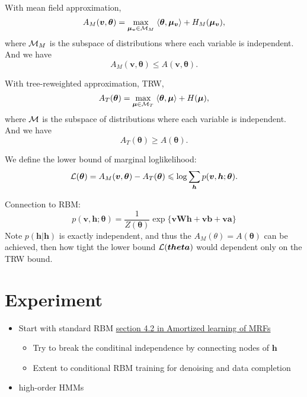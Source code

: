 With mean field approximation,
\begin{equation}
  A_{M}(\bm{v}, \bm{\theta}) = \underset{\bm{\mu}_{\bm{v}} \in \mathcal{M}_M}{\max}\;{ \langle {\bm{\theta}, \bm{\mu}_{\bm{v}}} \rangle + H_{M}(\bm{\mu}_{\bm{v}})},
\end{equation}
where $\mathcal{M}_M$ is the subspace of distributions where each variable is independent. And we have
\begin{equation}
  A_{M}(\bm{v}, \bm{\theta}) \leq A(\bm{v}, \bm{\theta}).
\end{equation}

With tree-reweighted approximation, TRW,
\begin{equation}
  A_{T}(\bm{\theta}) = \underset{\bm{\mu} \in \mathcal{M}_T}{\max}\;{ \langle {\bm{\theta}, \bm{\mu}} \rangle + H(\bm{\mu})},
\end{equation}
where $\mathcal{M}$ is the subspace of distributions where each variable is independent. And we have
\begin{equation}
  A_{T}(\bm{\theta}) \geq A( \bm{\theta}).
\end{equation}

We define the lower bound of marginal loglikelihood:
\begin{equation}
  \mathcal{L}(\bm{\theta}) = A_{M}(\bm{v}, \bm{\theta}) - A_{T}(\bm{\theta}) \leqslant \log\sum_{\bm{h}}p(\bm{v}, \bm{h}; \bm{\theta}).
\end{equation}

Connection to RBM:
\begin{equation}
  p(\bm{v}, \bm{h}; \bm{\theta}) = \frac{1}{Z(\bm{\theta})} \exp\{\bm{v}\bm{W}\bm{h} + \bm{v}\bm{b} + \bm{v}\bm{a}\}
\end{equation}
Note $p(\bm{h}|\bm{h})$ is exactly independent, and thus the $A_{M}(\theta) = A(\bm{\theta})$ can be achieved, then how tight the lower bound $\mathcal{L}(\bm{theta})$ would dependent only on the TRW bound.


\color{red}{I should also consider how to use the trained model for prediction.}
\section{Experiment}
\begin{itemize}
\item Start with standard RBM \href{https://papers.nips.cc/paper/9687-amortized-bethe-free-energy-minimization-for-learning-mrfs.pdf}{section 4.2 in Amortized learning of MRFs}
  \begin{itemize}
  \item Try to break the conditinal independence by connecting nodes of $\bm{h}$
  \item Extent to conditional RBM training for denoising and data completion
  \end{itemize}
\item high-order HMMs

\end{itemize}




